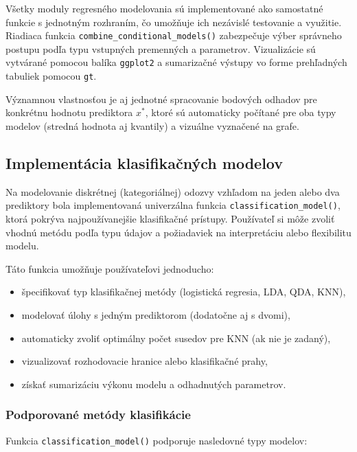 Všetky moduly regresného modelovania sú implementované ako samostatné funkcie s jednotným rozhraním, čo umožňuje ich nezávislé testovanie a využitie. Riadiaca funkcia \texttt{combine\_conditional\_models()} zabezpečuje výber správneho postupu podľa typu vstupných premenných a parametrov. Vizualizácie sú vytvárané pomocou balíka \texttt{ggplot2} a sumarizačné výstupy vo forme prehľadných tabuliek pomocou \texttt{gt}.

Významnou vlastnosťou je aj jednotné spracovanie bodových odhadov pre konkrétnu hodnotu prediktora $x^*$, ktoré sú automaticky počítané pre oba typy modelov (stredná hodnota aj kvantily) a vizuálne vyznačené na grafe.


\subsection{Implementácia klasifikačných modelov}\label{subsec:classification_implementation}

Na modelovanie diskrétnej (kategoriálnej) odozvy vzhľadom na jeden alebo dva prediktory bola implementovaná univerzálna funkcia \texttt{classification\_model()}, ktorá pokrýva najpoužívanejšie klasifikačné prístupy. Používateľ si môže zvoliť vhodnú metódu podľa typu údajov a požiadaviek na interpretáciu alebo flexibilitu modelu.

Táto funkcia umožňuje používateľovi jednoducho:

\begin{itemize}
\setlength{\itemsep}{0pt}
  \setlength{\parskip}{0pt}
  \item špecifikovať typ klasifikačnej metódy (logistická regresia, LDA, QDA, KNN),
  \item modelovať úlohy s jedným prediktorom (dodatočne aj s dvomi),
  \item automaticky zvoliť optimálny počet susedov pre KNN (ak nie je zadaný),
  \item vizualizovať rozhodovacie hranice alebo klasifikačné prahy,
  \item získať sumarizáciu výkonu modelu a odhadnutých parametrov.
\end{itemize}

\subsubsection{Podporované metódy klasifikácie}

Funkcia \texttt{classification\_model()} podporuje nasledovné typy modelov:

